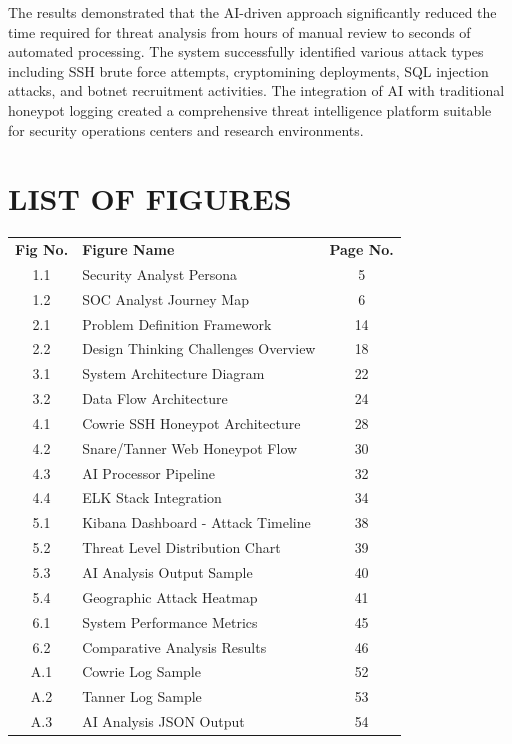 \documentclass[12pt,a4paper]{report}
\begin{document}
The results demonstrated that the AI-driven approach significantly reduced the time required for threat analysis from hours of manual review to seconds of automated processing. The system successfully identified various attack types including SSH brute force attempts, cryptomining deployments, SQL injection attacks, and botnet recruitment activities. The integration of AI with traditional honeypot logging created a comprehensive threat intelligence platform suitable for security operations centers and research environments.

\newpage

\tableofcontents
\newpage

\chapter*{LIST OF FIGURES}
\thispagestyle{plain}

\begin{center}
\begin{tabular}{c p{9cm} c}
\textbf{Fig No.} & \textbf{Figure Name} & \textbf{Page No.} \\[0.3cm]
1.1 & Security Analyst Persona & 5 \\
1.2 & SOC Analyst Journey Map & 6 \\
2.1 & Problem Definition Framework & 14 \\
2.2 & Design Thinking Challenges Overview & 18 \\
3.1 & System Architecture Diagram & 22 \\
3.2 & Data Flow Architecture & 24 \\
4.1 & Cowrie SSH Honeypot Architecture & 28 \\
4.2 & Snare/Tanner Web Honeypot Flow & 30 \\
4.3 & AI Processor Pipeline & 32 \\
4.4 & ELK Stack Integration & 34 \\
5.1 & Kibana Dashboard - Attack Timeline & 38 \\
5.2 & Threat Level Distribution Chart & 39 \\
5.3 & AI Analysis Output Sample & 40 \\
5.4 & Geographic Attack Heatmap & 41 \\
6.1 & System Performance Metrics & 45 \\
6.2 & Comparative Analysis Results & 46 \\
A.1 & Cowrie Log Sample & 52 \\
A.2 & Tanner Log Sample & 53 \\
A.3 & AI Analysis JSON Output & 54 \\
\end{tabular}
\end{center}
\end{document}

